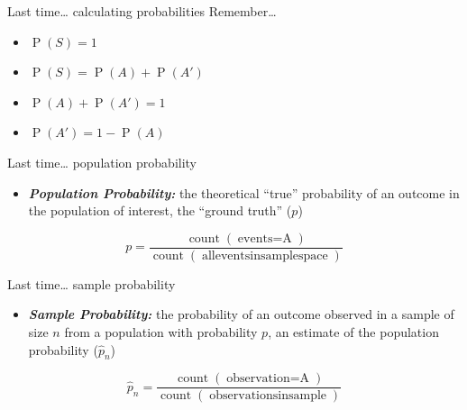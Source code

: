 \documentclass[
  ignorenonframetext,
]{beamer}
\providecommand{\tightlist}{%
  \setlength{\itemsep}{0pt}\setlength{\parskip}{0pt}}\usepackage{longtable,booktabs,array}
\begin{document}
\begin{frame}{Last time\ldots{} calculating probabilities}
\label{last-time-calculating-probabilities}
Remember\ldots{}

\begin{itemize}
\item
  \(\operatorname{P}(S)=1\)
\item
  \(\operatorname{P}(S)=\operatorname{P}(A)+\operatorname{P}(A')\)
\item
  \(\operatorname{P}(A)+\operatorname{P}(A')=1\)
\item
  \(\operatorname{P}(A')=1-\operatorname{P}(A)\)
\end{itemize}
\end{frame}

\begin{frame}{Last time\ldots{} population probability}
\label{last-time-population-probability}
\begin{itemize}
\tightlist
\item
  \textbf{\emph{Population Probability:}} the theoretical ``true''
  probability of an outcome in the population of interest, the ``ground
  truth'' (\(p\))
\end{itemize}

\[
p=\frac{\operatorname{count}(\operatorname{events = A})}{\operatorname{count}(\operatorname{all events in sample space})}
\]
\end{frame}

\begin{frame}{Last time\ldots{} sample probability}
\label{last-time-sample-probability}
\begin{itemize}
\tightlist
\item
  \textbf{\emph{Sample Probability:}} the probability of an outcome
  observed in a sample of size \(n\) from a population with probability
  \(p\), an estimate of the population probability (\(\hat{p}_n\))
\end{itemize}

\[
\hat{p}_n=\frac{\operatorname{count}(\operatorname{observation = A})}{\operatorname{count}(\operatorname{observations in sample})}
\]
\end{frame}
\end{document}
